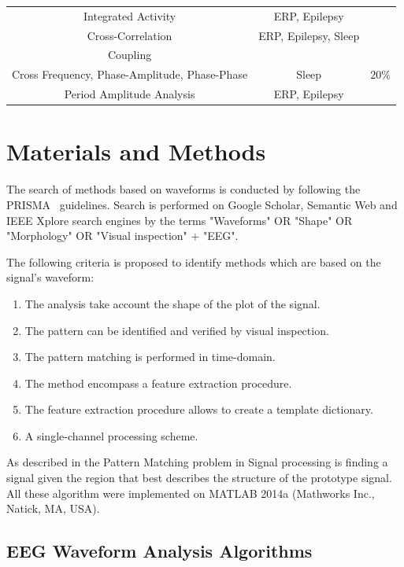 \documentclass[brainsci,article,submit,moreauthors,pdftex,10pt,a4paper]{mdpi}
\begin{document}
\begin{table}[H]
\begin{tabular}{ccc}
Integrated Activity               & ERP, Epilepsy & \citep{Cacioppo2007, Shah2015} \\
Cross-Correlation                & ERP, Epilepsy, Sleep & \citep{Cacioppo2007, Shah2015} \\
Coupling \\ Cross Frequency,  Phase-Amplitude, Phase-Phase     & Sleep & $20\%$ \\
Period Amplitude Analysis  & ERP, Epilepsy & \citep{Cacioppo2007, Shah2015} \\
\bottomrule
\end{tabular}
\label{tab:results}
\end{table}


\section{Materials and Methods}

The search of methods based on waveforms is conducted by following the PRISMA~\citep{Moher2009} guidelines.  Search is performed on Google Scholar, Semantic Web and IEEE Xplore search engines by the terms "Waveforms" OR "Shape" OR "Morphology" OR "Visual inspection" + "EEG".

The following criteria is proposed to identify methods which are based on the signal's waveform:

\begin{enumerate}
\item The analysis take account the shape of the plot of the signal.
\item The pattern can be identified and verified by visual inspection.
\item The pattern matching is performed in time-domain.
\item The method encompass a feature extraction procedure.
\item The feature extraction procedure allows to create a template dictionary.
\item A single-channel processing scheme.
\end{enumerate}

As described in \citep{allen2004signal} the Pattern Matching problem in Signal processing is finding a signal given the region that best describes the structure of the prototype signal.   All these algorithm were implemented on MATLAB 2014a (Mathworks Inc., Natick, MA, USA). 

\subsection{EEG Waveform Analysis Algorithms}
\label{Algorithms}
\end{document}
